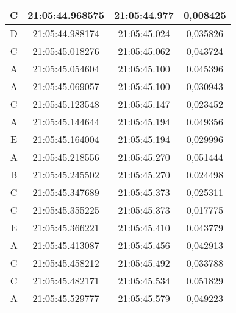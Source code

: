 \begin{table}[!h]
\begin{tabular}{|ccc|c|}
  \multicolumn{1}{|c|}{C}    & \multicolumn{1}{c|}{21:05:44.968575} & 21:05:44.977       & 0,008425      \\ \hline
  \multicolumn{1}{|c|}{D}    & \multicolumn{1}{c|}{21:05:44.988174} & 21:05:45.024       & 0,035826      \\ \hline
  \multicolumn{1}{|c|}{C}    & \multicolumn{1}{c|}{21:05:45.018276} & 21:05:45.062       & 0,043724      \\ \hline
  \multicolumn{1}{|c|}{A}    & \multicolumn{1}{c|}{21:05:45.054604} & 21:05:45.100       & 0,045396      \\ \hline
  \multicolumn{1}{|c|}{A}    & \multicolumn{1}{c|}{21:05:45.069057} & 21:05:45.100       & 0,030943      \\ \hline
  \multicolumn{1}{|c|}{C}    & \multicolumn{1}{c|}{21:05:45.123548} & 21:05:45.147       & 0,023452      \\ \hline
  \multicolumn{1}{|c|}{A}    & \multicolumn{1}{c|}{21:05:45.144644} & 21:05:45.194       & 0,049356      \\ \hline
  \multicolumn{1}{|c|}{E}    & \multicolumn{1}{c|}{21:05:45.164004} & 21:05:45.194       & 0,029996      \\ \hline
  \multicolumn{1}{|c|}{A}    & \multicolumn{1}{c|}{21:05:45.218556} & 21:05:45.270       & 0,051444      \\ \hline
  \multicolumn{1}{|c|}{B}    & \multicolumn{1}{c|}{21:05:45.245502} & 21:05:45.270       & 0,024498      \\ \hline
  \multicolumn{1}{|c|}{C}    & \multicolumn{1}{c|}{21:05:45.347689} & 21:05:45.373       & 0,025311      \\ \hline
  \multicolumn{1}{|c|}{C}    & \multicolumn{1}{c|}{21:05:45.355225} & 21:05:45.373       & 0,017775      \\ \hline
  \multicolumn{1}{|c|}{E}    & \multicolumn{1}{c|}{21:05:45.366221} & 21:05:45.410       & 0,043779      \\ \hline
  \multicolumn{1}{|c|}{A}    & \multicolumn{1}{c|}{21:05:45.413087} & 21:05:45.456       & 0,042913      \\ \hline
  \multicolumn{1}{|c|}{C}    & \multicolumn{1}{c|}{21:05:45.458212} & 21:05:45.492       & 0,033788      \\ \hline
  \multicolumn{1}{|c|}{C}    & \multicolumn{1}{c|}{21:05:45.482171} & 21:05:45.534       & 0,051829      \\ \hline
  \multicolumn{1}{|c|}{A}    & \multicolumn{1}{c|}{21:05:45.529777} & 21:05:45.579       & 0,049223      \\ \hline

\end{tabular}
\end{table}
